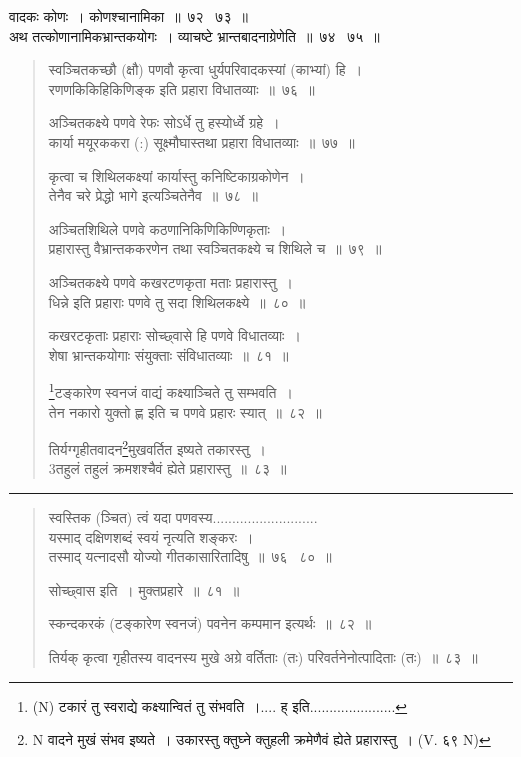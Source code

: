 \documentclass[11pt, openany]{book}
\begin{document}
{\qtt वादकः} कोणः~। कोणश्चानामिका~॥~७२ \textendash\ ७३~॥\\

अथ तत्कोणानामिक{\qtt भ्रान्तकयोगः}~। व्याचष्टे {\qtt भ्रान्तबादनाग्रेणेति}~॥~७४ \textendash\ ७५~॥

\newpage

\begin{quote}
{\na स्वञ्चितकच्छौ (क्षौ) पणवौ कृत्वा धुर्यपरिवादकस्यां (काभ्यां) हि~।\\
रणणकिकिहिकिणिङ्क इति प्रहारा विधातव्याः~॥~७६~॥

अञ्चितकक्ष्ये पणवे रेफः सोऽर्धे तु हस्योर्ध्वे ग्रहे~।\\
कार्या मयूरककरा (:) सूक्ष्मौघास्तथा प्रहारा विधातव्याः~॥~७७~॥

कृत्वा च शिथिलकक्ष्यां कार्यास्तु कनिष्टिकाग्रकोणेन~।\\
तेनैव चरे प्रेद्धो भागे इत्यञ्चितेनैव~॥~७८~॥

अञ्चितशिथिले पणवे कठणानिकिणिकिण्णिकृताः~।\\
प्रहारास्तु वैभ्रान्तककरणेन तथा स्वञ्चितकक्ष्ये च शिथिले च~॥~७९~॥

अञ्चितकक्ष्ये पणवे कखरटणकृता मताः प्रहारास्तु~।\\
धिन्ने इति प्रहाराः पणवे तु सदा शिथिलकक्ष्ये~॥~८०~॥

कखरटकृताः प्रहाराः सोच्छ्वासे हि पणवे विधातव्याः~।\\
शेषा भ्रान्तकयोगाः संयुक्ताः संविधातव्याः~॥~८१~॥

\renewcommand{\thefootnote}{1}\footnote{(N) टकारं तु स्वराद्ये कक्ष्यान्वितं तु संभवति~।.... ह् इति...................... }टङ्कारेण स्वनजं वाद्यं कक्ष्याञ्चिते तु सम्भवति~।\\
तेन नकारो युक्तो ह्ण इति च पणवे प्रहारः स्यात्~॥~८२~॥

तिर्यग्गृहीतवादन\renewcommand{\thefootnote}{2}\footnote{N वादने मुखं संभव इष्यते~। उकारस्तु क्तुघ्ने क्तुहली क्रमेणैवं ह्येते प्रहारास्तु~। (V. ६९ N)}मुखवर्तित इष्यते तकारस्तु~।\\
3तहुलं तहुलं क्रमशश्चैवं ह्येते प्रहारास्तु~॥~८३~॥}
\end{quote}

\hrule

\begin{quote}
{\qt स्वस्तिक (ञ्चित) त्वं यदा पणवस्य........................... \\
यस्माद् दक्षिणशब्दं स्वयं नृत्यति शङ्करः~।\\
तस्माद् यत्नादसौ योज्यो गीतकासारितादिषु~॥~७६ \textendash\ ८०~॥

सोच्छ्वास इति~। मुक्तप्रहारे~॥~८१~॥

स्कन्दकरकं (टङ्कारेण स्वनजं) पवनेन कम्पमान इत्यर्थः~॥~८२~॥

तिर्यक् कृत्वा गृहीतस्य वादनस्य मुखे अग्रे वर्तिताः (तः) परिवर्तनेनोत्पादिताः (तः)~॥~८३~॥}
\end{quote}
\end{document}
